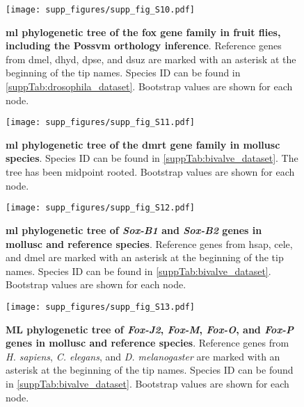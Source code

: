 \begin{figure}[ht]
	\centering
	\texttt{[image: supp\_figures/supp\_fig\_S10.pdf]}
	\caption[\textbf{\gls{ml} phylogenetic tree of the \gls{fox} gene family in fruit flies, including the Possvm orthology inference}.]
	{
		\textbf{\gls{ml} phylogenetic tree of the \gls{fox} gene family in fruit flies, including the Possvm orthology inference}. Reference genes from \gls{dmel}, \gls{dhyd}, \gls{dpse}, and \gls{dsuz} are marked with an asterisk at the beginning of the tip names. Species ID can be found in \cref{suppTab:drosophila_dataset}. Bootstrap values are shown for each node.
	}
	\label{suppFig:fox_drosophila}
\end{figure}

\begin{figure}[ht]
	\centering
	\texttt{[image: supp\_figures/supp\_fig\_S11.pdf]}
	\caption[\textbf{\gls{ml} phylogenetic tree of the \gls{dmrt} gene family in mollusc species}]
	{
		\textbf{\gls{ml} phylogenetic tree of the \gls{dmrt} gene family in mollusc species}. Species ID can be found in \cref{suppTab:bivalve_dataset}. The tree has been midpoint rooted. Bootstrap values are shown for each node.
	}
	\label{suppFig:dmrt_molluscOnly}
\end{figure}

\begin{figure}[ht]
	\centering
	\texttt{[image: supp\_figures/supp\_fig\_S12.pdf]}
	\caption[\textbf{\gls{ml} phylogenetic tree of \textit{Sox-B1} and \textit{Sox-B2} genes in mollusc and reference species}]
	{
		\textbf{\gls{ml} phylogenetic tree of \textit{Sox-B1} and \textit{Sox-B2} genes in mollusc and reference species}. Reference genes from \gls{hsap}, \gls{cele}, and \gls{dmel} are marked with an asterisk at the beginning of the tip names. Species ID can be found in \cref{suppTab:bivalve_dataset}. Bootstrap values are shown for each node.
	}
	\label{suppFig:sox_B12}
\end{figure}

\begin{figure}[ht]
	\centering
	\texttt{[image: supp\_figures/supp\_fig\_S13.pdf]}
	\caption[\textbf{ML phylogenetic tree of \textit{Fox-J2}, \textit{Fox-M}, \textit{Fox-O}, and \textit{Fox-P} genes in mollusc and reference species}]
	{
		\textbf{ML phylogenetic tree of \textit{Fox-J2}, \textit{Fox-M}, \textit{Fox-O}, and \textit{Fox-P} genes in mollusc and reference species}. Reference genes from \textit{H. sapiens}, \textit{C. elegans}, and \textit{D. melanogaster} are marked with an asterisk at the beginning of the tip names. Species ID can be found in \cref{suppTab:bivalve_dataset}. Bootstrap values are shown for each node.
	}
	\label{suppFig:fox_JMOP}
\end{figure}

